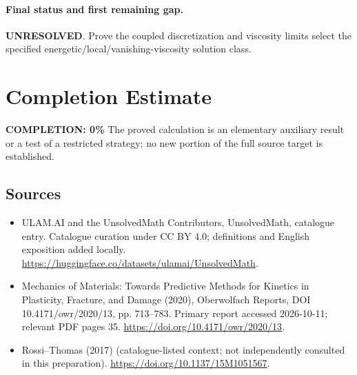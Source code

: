 \documentclass[11pt]{article}
\begin{document}
\paragraph{Final status and first remaining gap.}
\textbf{UNRESOLVED}. Prove the coupled discretization and viscosity limits select the specified energetic/local/vanishing-viscosity solution class.

\section{Completion Estimate}
\noindent\textbf{COMPLETION: 0\%}
The proved calculation is an elementary auxiliary result or a test of a restricted strategy; no new portion of the full source target is established.

\subsection{Sources}
\begin{itemize}
\item[\hypertarget{source:statement:1}{S1}] ULAM.AI and the UnsolvedMath Contributors, UnsolvedMath, catalogue entry. Catalogue curation under CC BY 4.0; definitions and English exposition added locally.
\url{https://huggingface.co/datasets/ulamai/UnsolvedMath}.
\item[\hypertarget{source:statement:2}{S2}] Mechanics of Materials: Towards Predictive Methods for Kinetics in Plasticity, Fracture, and Damage (2020), Oberwolfach Reports, DOI 10.4171/owr/2020/13, pp. 713--783. Primary report accessed 2026-10-11; relevant PDF pages 35.
\url{https://doi.org/10.4171/owr/2020/13}.
\item[\hypertarget{source:statement:3}{S3}] Rossi--Thomas (2017) (catalogue-listed context; not independently consulted in this preparation).
\url{https://doi.org/10.1137/15M1051567}.
\end{itemize}
\label{end:statement}
\end{document}

